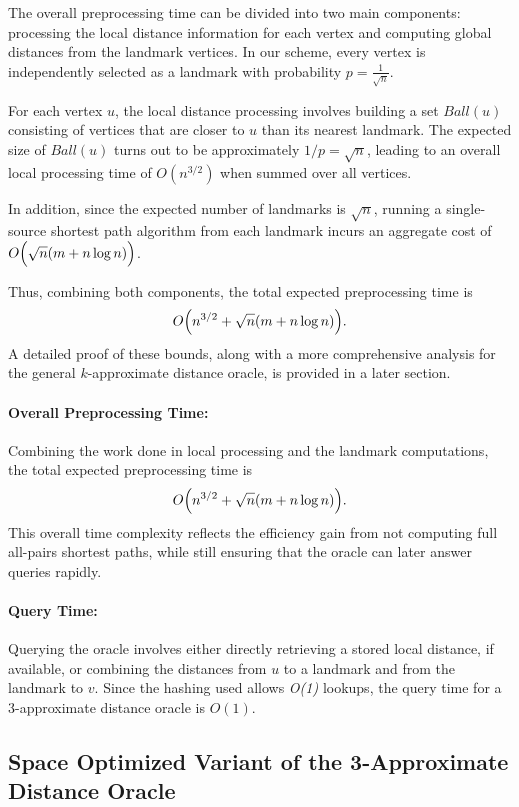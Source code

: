 \documentclass{article}
\begin{document}
The overall preprocessing time can be divided into two main components: processing the local distance information for each vertex and computing global distances from the landmark vertices. In our scheme, every vertex is independently selected as a landmark with probability \(p=\frac{1}{\sqrt{n}}\).

For each vertex \(u\), the local distance processing involves building a set \(Ball(u)\) consisting of vertices that are closer to \(u\) than its nearest landmark. The expected size of \(Ball(u)\) turns out to be approximately \(1/p = \sqrt{n}\), leading to an overall local processing time of \(O(n^{3/2})\) when summed over all vertices.

In addition, since the expected number of landmarks is \(\sqrt{n}\), running a single-source shortest path algorithm from each landmark incurs an aggregate cost of \(O\Bigl(\sqrt{n}(m + n\log n)\Bigr)\).

Thus, combining both components, the total expected preprocessing time is
\[
O\Bigl(n^{3/2} + \sqrt{n}(m + n\log n)\Bigr).
\]
A detailed proof of these bounds, along with a more comprehensive analysis for the general \(k\)-approximate distance oracle, is provided in a later section.


\paragraph{Overall Preprocessing Time:}  
Combining the work done in local processing and the landmark computations, the total expected preprocessing time is
\[
O\Bigl(n^{3/2} + \sqrt{n}(m + n \log n)\Bigr).
\]
This overall time complexity reflects the efficiency gain from not computing full all-pairs shortest paths, while still ensuring that the oracle can later answer queries rapidly.


\paragraph{Query Time:} Querying the oracle involves either directly retrieving a stored local distance, if available, or combining the distances from \(u\) to a landmark and from the landmark to \(v\). Since the hashing 
used allows \textit{O(1)} lookups, the query time for a 3-approximate distance oracle is \(O(1)\).

\subsection{Space Optimized Variant of the 3-Approximate Distance Oracle}
\end{document}

